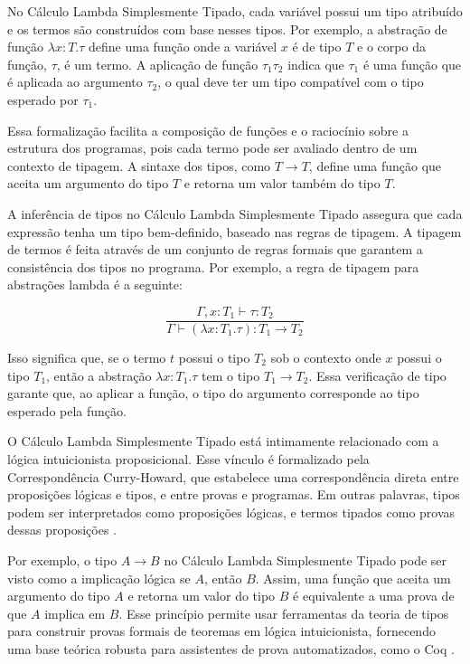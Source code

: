 No Cálculo Lambda Simplesmente Tipado, cada variável possui um tipo atribuído e os termos são construídos com base nesses tipos.
Por exemplo, a abstração de função $\lambda x:T. \tau$ define uma função onde a variável $x$ é de tipo $T$ e o corpo da função, $\tau$, é um termo.
A aplicação de função $\tau_1 \tau_2$ indica que $\tau_1$ é uma função que é aplicada ao argumento $\tau_2$, o qual deve ter um tipo compatível com o tipo esperado por $\tau_1$.

Essa formalização facilita a composição de funções e o raciocínio sobre a estrutura dos programas, pois cada termo pode ser avaliado dentro de um contexto de tipagem.
A sintaxe dos tipos, como $T \to T$, define uma função que aceita um argumento do tipo $T$ e retorna um valor também do tipo $T$.

A inferência de tipos no Cálculo Lambda Simplesmente Tipado assegura que cada expressão tenha um tipo bem-definido, baseado nas regras de tipagem.
A tipagem de termos é feita através de um conjunto de regras formais que garantem a consistência dos tipos no programa.
Por exemplo, a regra de tipagem para abstrações lambda é a seguinte:

\[
  \frac{\Gamma, x:T_1 \vdash \tau:T_2}{\Gamma \vdash (\lambda x:T_1. \tau): T_1 \to T_2}
\]

Isso significa que, se o termo $t$ possui o tipo $T_2$ sob o contexto onde $x$ possui o tipo $T_1$, então a abstração $\lambda x:T_1. \tau$ tem o tipo $T_1 \to T_2$.
Essa verificação de tipo garante que, ao aplicar a função, o tipo do argumento corresponde ao tipo esperado pela função.

O Cálculo Lambda Simplesmente Tipado está intimamente relacionado com a lógica intuicionista proposicional.
Esse vínculo é formalizado pela Correspondência Curry-Howard, que estabelece uma correspondência direta entre proposições lógicas e tipos, e entre provas e programas.
Em outras palavras, tipos podem ser interpretados como proposições lógicas, e termos tipados como provas dessas proposições \cite{PIERCE2002}.

Por exemplo, o tipo $A \to B$ no Cálculo Lambda Simplesmente Tipado pode ser visto como a implicação lógica se $A$, então $B$.
Assim, uma função que aceita um argumento do tipo $A$ e retorna um valor do tipo $B$ é equivalente a uma prova de que $A$ implica em $B$.
Esse princípio permite usar ferramentas da teoria de tipos para construir provas formais de teoremas em lógica intuicionista, fornecendo uma base teórica robusta para assistentes de prova automatizados, como o Coq \cite{COQUAND1998}.

